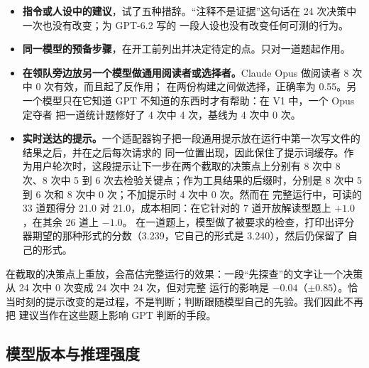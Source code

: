 \begin{itemize}[leftmargin=1.4em]
  \item \textbf{指令或人设中的建议}，试了五种措辞。“注释不是证据”这句话在 24 次决策中一次也没有改变；为 GPT-6.2 写的
    一段人设也没有改变任何可测的行为。
  \item \textbf{同一模型的预备步骤}，在开工前列出并决定待定的点。只对一道题起作用。
  \item \textbf{在领队旁边放另一个模型做通用阅读者或选择者。}Claude Opus 做阅读者 8 次中 0 次有效，而且起了反作用；
    在两份构建之间做选择，正确率为 0.55。另一个模型只在它知道 GPT 不知道的东西时才有帮助：在 V1 中，一个 Opus 定夺者
    把一道统计题修好了 4 次中 4 次，基线为 4 次中 0 次。
  \item \textbf{实时送达的提示。}一个适配器钩子把一段通用提示放在运行中第一次写文件的结果之后，并在之后每次请求的
    同一位置出现，因此保住了提示词缓存。作为用户轮次时，这段提示让下一步在两个截取的决策点上分别有 8 次中 8 次、8 次中
    5 到 6 次去检验关键点；作为工具结果的后缀时，分别是 8 次中 5 到 6 次和 8 次中 0 次；不加提示时 4 次中 0 次。然而在
    完整运行中，可读的 33 道题得分 21.0 对 21.0，成本相同：在它针对的 7 道开放解读型题上 $+1.0$，在其余 26 道上 $-1.0$。
    在一道题上，模型做了被要求的检查，打印出评分器期望的那种形式的分数（3.239，它自己的形式是 3.240），然后仍保留了
    自己的形式。
\end{itemize}

在截取的决策点上重放，会高估完整运行的效果：一段“先探查”的文字让一个决策从 24 次中 0 次变成 24 次中 24 次，但对完整
运行的影响是 $-0.04$（$\pm 0.85$）。恰当时刻的提示改变的是过程，不是判断；判断跟随模型自己的先验。我们因此不再把
建议当作在这些题上影响 GPT 判断的手段。

\subsection{模型版本与推理强度}

